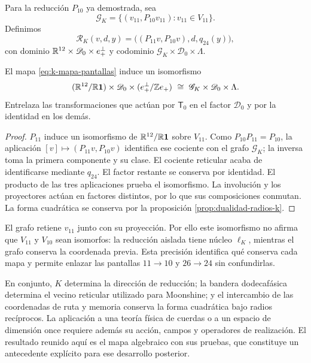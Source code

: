 Para la reducción \(P_{10}\) ya demostrada, sea
\[
 \mathscr G_K=\{(v_{11},P_{10}v_{11}):v_{11}\in V_{11}\}.
\]
Definimos
\begin{equation}
 \mathcal R_K(v,d,y)
 =\bigl((P_{11}v,P_{10}v),d,q_{24}(y)\bigr),
 \label{eq:k-mapa-pantallas}
\end{equation}
con dominio \(\mathbb R^{12}\times\mathscr D_0\times e_+^\perp\)
y codominio \(\mathscr G_K\times\mathscr D_0\times\Lambda\).

\begin{theorem}
\label{thm:k-pantallas-coordinadas}
El mapa \eqref{eq:k-mapa-pantallas} induce un isomorfismo
\[
 (\mathbb R^{12}/\mathbb R\mathbf1)\times\mathscr D_0
       \times(e_+^\perp/\mathbb Z e_+)
 \ \cong\ \mathscr G_K\times\mathscr D_0\times\Lambda.
\]
Entrelaza las transformaciones que actúan por \(\mathsf T_0\)
en el factor \(\mathscr D_0\) y por la identidad en los demás.
\end{theorem}
\begin{proof}
\(P_{11}\) induce un isomorfismo de \(\mathbb R^{12}/\mathbb R\mathbf1\)
sobre \(V_{11}\). Como \(P_{10}P_{11}=P_{10}\), la aplicación
\([v]\mapsto(P_{11}v,P_{10}v)\) identifica ese cociente con
el grafo \(\mathscr G_K\); la inversa toma la primera componente
y su clase. El cociente reticular acaba de identificarse mediante
\(q_{24}\). El factor restante se conserva por identidad.
El producto de las tres aplicaciones prueba el isomorfismo. La
involución y los proyectores actúan en factores distintos, por lo
que sus composiciones conmutan. La forma cuadrática se conserva
por la proposición \ref{prop:dualidad-radios-k}.
\end{proof}

El grafo retiene \(v_{11}\) junto con su proyección. Por ello este
isomorfismo no afirma que \(V_{11}\) y \(V_{10}\) sean isomorfos:
la reducción aislada tiene núcleo \(\ell_K\), mientras el grafo
conserva la coordenada previa. Esta precisión identifica qué conserva
cada mapa y permite enlazar las pantallas \(11\to10\) y
\(26\to24\) sin confundirlas.

En conjunto, \(K\) determina la dirección de reducción; la bandera
dodecafásica determina el vecino reticular utilizado para Moonshine;
y el intercambio de las coordenadas de ruta y memoria conserva la
forma cuadrática bajo radios recíprocos. La aplicación a una teoría
física de cuerdas o a un espacio de dimensión once requiere además
su acción, campos y operadores de realización. El resultado reunido
aquí es el mapa algebraico con sus pruebas, que constituye un
antecedente explícito para ese desarrollo posterior.
